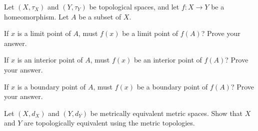 \item Let $(X, \tau_X)$ and $(Y, \tau_Y)$ be topological spaces, and let $f : X \to Y$ be a homeomorphism. Let $A$ be a subset of $X$.
\ba
\item If $x$ is a limit point of $A$, must $f(x)$ be a limit point of $f(A)$? Prove your answer.

\item If $x$ is an interior point of $A$, must $f(x)$ be an interior point of $f(A)$? Prove your answer.

\item If $x$ is a boundary point of $A$, must $f(x)$ be a boundary point of $f(A)$? Prove your answer.

\ea

\begin{comment}

\ExerciseSolution

\ba
\item Let $x$ be a limit point of $A$ and let $O$ be an open set containing $f(x)$ in $Y$. Since $f$ is continuous, we know that $f^{-1}(O)$ is an open set in $X$ that contains $x$. Thus, $f^{-1}(O)$ contains a point $a$ in $A$ different from $x$. Since $a \in f^{-1}(O)$ we know that $f(a) \in O$. Also, $a \in A$ implies that $f(a) \in f(A)$. The fact that $f$ is a bijection means that $f(a) \neq f(x)$. But then $O$ contains the element $f(a)$ in $f(A)$ that is different from $f(x)$, so $f(x)$ is a limit point of $f(A)$. 

\item Let $x$ be an interior point of $A$. Then there is an open set $O$ with $x \in O \subseteq A$. The fact that $f^{-1}$ is continuous means that $f(O)$ is an open subset of $Y$. Since $O \subseteq A$, we also have $f(x) \in f(O) \subseteq f(A)$. So $f(A)$ is a neighborhood of $f(x)$ and $f(x)$ is an interior point of $f(A)$. 

\item Let $x$ be a boundary point of $A$, and let $O$ be an open set that contains $f(x)$. Since $f$ is continuous, we know that $f^{-1}(O)$ is an open set in $X$ that contains $x$. Thus, $f^{-1}(O)$ contains a point $a$ in $A$ and a point $c$ in $X \setminus A$. Then $f(a) \in f(A)$ and $f(x) \in f(X \setminus A) = Y \setminus f(A)$. Thus, $f(x)$ is a boundary point of $f(A)$. 

\ea


\end{comment}

\item \label{ex:me_implies_te} Let $(X, d_X)$ and $(Y, d_Y)$ be metrically equivalent metric spaces. Show that $X$ and $Y$ are topologically equivalent using the metric topologies. 

